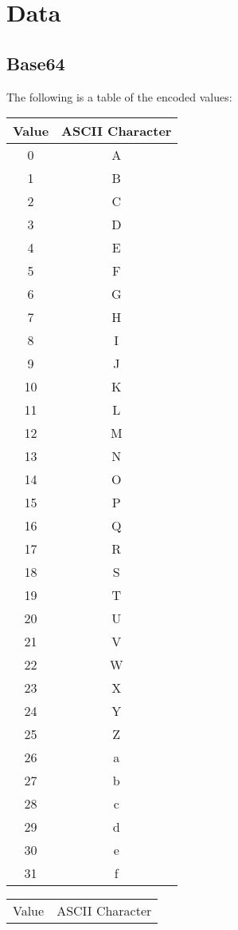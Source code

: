 \documentclass[12pt]{book}
\begin{document}
  \newpage
  \section{Data}

  \subsection{Base64}

  The following is a table of the encoded values:

  {\ttfamily\begin{tabular}{c c}
    \hline
    Value & ASCII Character \\
    \hline
     0 & A \\
     1 & B \\
     2 & C \\
     3 & D \\
     4 & E \\
     5 & F \\
     6 & G \\
     7 & H \\
     8 & I \\
     9 & J \\
    10 & K \\
    11 & L \\
    12 & M \\
    13 & N \\
    14 & O \\
    15 & P \\
    16 & Q \\
    17 & R \\
    18 & S \\
    19 & T \\
    20 & U \\
    21 & V \\
    22 & W \\
    23 & X \\
    24 & Y \\
    25 & Z \\
    26 & a \\
    27 & b \\
    28 & c \\
    29 & d \\
    30 & e \\
    31 & f \\
  \end{tabular}
  \quad
  \begin{tabular}{c c}
    \hline
    Value & ASCII Character \\

\end{tabular}}
\end{document}
